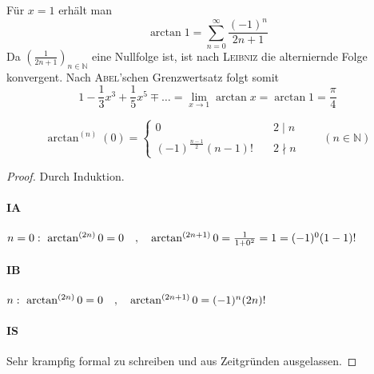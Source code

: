 \documentclass[a4paper, 12pt]{scrartcl}
\begin{document}
Für $x = 1$ erhält man
\[ \arctan 1 = \sum_{n=0}^\infty \frac{(-1)^n}{2n+1}  \]
Da $(\frac{1}{2n+1})_{n \in \mathbb{N}}$ eine Nullfolge ist, ist nach \textsc{Leibniz} die alterniernde Folge konvergent. Nach \textsc{Abel}'schen Grenzwertsatz folgt somit
\[  1 - \frac{1}{3}x^3 + \frac{1}{5}x^5 \mp \dots = \lim_{x \rightarrow 1} \arctan x = \arctan 1 = \frac{\pi}{4} \]
\begin{lemma}
    \[ \arctan^{(n)}(0) = \begin{cases}
            0 \quad& 2 \mid n \\
            (-1)^{\frac{n-1}2}(n-1)! \quad& 2 \nmid n
        \end{cases} \qquad (n \in \mathbb{N})
    \]
\end{lemma}
\begin{proof}
Durch Induktion.
\paragraph*{IA}\quad $n = 0 :~ \arctan^{(2n)} 0 = 0\quad\qc \arctan^{(2n+1)} 0 = \frac{1}{1+0^2} = 1 = (-1)^0(1-1)!$
\paragraph*{IB}\quad $n:~ \arctan^{(2n)} 0 = 0 \quad\qc \arctan^{(2n+1)} 0 = (-1)^n(2n)!$
\paragraph*{IS} Sehr krampfig formal zu schreiben und aus Zeitgründen ausgelassen.
\end{proof}
\end{document}

